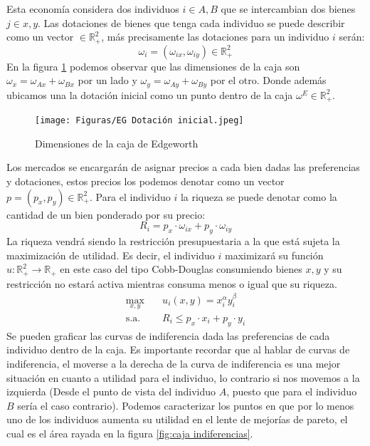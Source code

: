 Esta economía considera dos individuos $i \in A,B$ que se intercambian dos bienes $j \in x,y$. Las dotaciones de bienes que tenga cada individuo se puede describir como un vector $\in \mathbb{R}^2_+$, más precisamente las dotaciones para un individuo $i$ serán:
\begin{equation*}
    \omega_i = (\omega_{ix} , \omega_{iy}) \in \mathbb{R}^2_+
\end{equation*}
En la figura \ref{fig:caja dimensiones} podemos observar que las dimensiones de la caja son $\omega_x = \omega_{Ax} + \omega_{Bx}$ por un lado y $\omega_y = \omega_{Ay} + \omega_{By}$ por el otro. Donde además ubicamos una la dotación inicial como un punto dentro de la caja $\omega^E \in \mathbb{R}^2_+$.
\begin{figure}
    \centering
    \caption{Dimensiones de la caja de Edgeworth}
    \texttt{[image: Figuras/EG Dotación inicial.jpeg]}
    \label{fig:caja dimensiones}
\end{figure}
Los mercados se encargarán de asignar precios a cada bien dadas las preferencias y dotaciones, estos precios los podemos denotar como un vector $p = (p_x, p_y) \in \mathbb{R}^2_+$. Para el individuo $i$ la riqueza se puede denotar como la cantidad de un bien ponderado por su precio: 
\begin{equation*}
    R_i = p_x \cdot \omega_{ix} + p_y \cdot \omega_{iy}
\end{equation*}
La riqueza vendrá siendo la restricción presupuestaria a la que está sujeta la maximización de utilidad. Es decir, el individuo $i$ maximizará su función $u: \mathbb{R}^2_+ \xrightarrow{} \mathbb{R}_+$ en este caso del tipo Cobb-Douglas consumiendo bienes $x,y$ y su restricción no estará activa mientras consuma menos o igual que su riqueza.
\begin{align*}
    \max_{x,y} &\quad u_i(x,y) = x_i^\alpha y_i^{\beta} \\
    \text{s.a.} &\quad R_i \leq p_x \cdot x_i + p_y \cdot y_i
\end{align*}
Se pueden graficar las curvas de indiferencia dada las preferencias de cada individuo dentro de la caja. Es importante recordar que al hablar de curvas de indiferencia, el moverse a la derecha de la curva de indiferencia es una mejor situación en cuanto a utilidad para el individuo, lo contrario si nos movemos a la izquierda (Desde el punto de vista del individuo $A$, puesto que para el individuo $B$ sería el caso contrario). Podemos caracterizar los puntos en que por lo menos uno de los individuos aumenta su utilidad en el lente de mejorías de pareto, el cual es el área rayada en la figura \ref{fig:caja indiferencias}.
